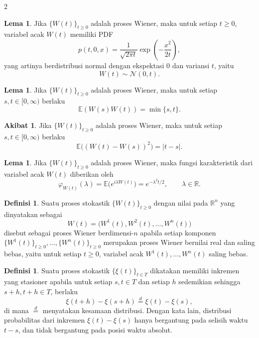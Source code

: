 \documentclass[a4paper,extrafontsizes, 9pt]{memoir}
\theoremstyle{definition}
\newtheorem{definisi}[kalstok]{Definisi}
\newtheorem{lemma}[kalstok]{Lema}
\newtheorem{akibat}[kalstok]{Akibat}
\theoremstyle{plain}
\theoremstyle{remark}
\begin{document}
\begin{multicols}{2}
  \begin{lemma}
    Jika $\{W(t)\}_{t\ge 0}$ adalah proses Wiener, maka untuk setiap $t\ge 0$, variabel acak
    $W(t)$ memiliki PDF
    \[p(t,0,x)=\frac{1}{\sqrt{2\pi t}}\exp\!\left(-\frac{x^2}{2t}\right),\]
    yang artinya berdistribusi normal dengan ekspektasi $0$ dan variansi $t$, yaitu
    \[W(t)\sim\mathcal{N}(0,t).\]
  \end{lemma}

  \begin{lemma}
    Jika $\{W(t)\}_{t\ge 0}$ adalah proses Wiener, maka untuk setiap $s,t\in[0,\infty)$ berlaku
    \[\mathbb{E}(W(s)W(t))=\min\{s,t\}.\]
  \end{lemma}

  \begin{akibat}
    Jika $\{W(t)\}_{t\ge 0}$ adalah proses Wiener, maka untuk setiap $s,t\in[0,\infty)$ berlaku
    \[\mathbb{E}\bigl((W(t)-W(s))^2\bigr)=|t-s|.\]
  \end{akibat}

  \begin{lemma}
    Jika $\{W(t)\}_{t\ge 0}$ adalah proses Wiener, maka fungsi karakteristik dari variabel acak
    $W(t)$ diberikan oleh
    \[\varphi_{W(t)}(\lambda)=\mathbb{E}\bigl(e^{i\lambda W(t)}\bigr)
      =e^{-\lambda^2 t/2},\qquad \lambda\in\mathbb{R}.\]
  \end{lemma}

  \begin{definisi}
    Suatu proses stokastik $\{W(t)\}_{t\ge 0}$ dengan nilai pada $\mathbb{R}^n$ yang dinyatakan
    sebagai
    \[W(t)=\bigl(W^1(t),W^2(t),\ldots,W^n(t)\bigr)\]
    disebut sebagai proses Wiener berdimensi-$n$ apabila setiap komponen
    $\{W^1(t)\}_{t\ge 0},\ldots,\{W^n(t)\}_{t\ge 0}$ merupakan proses Wiener bernilai real dan
    saling bebas, yaitu untuk setiap $t\ge 0$, variabel acak
    $W^1(t),\ldots,W^n(t)$ saling bebas.
  \end{definisi}

  \begin{definisi}
    Suatu proses stokastik $\{\xi(t)\}_{t\in T}$ dikatakan memiliki inkremen yang stasioner
    apabila untuk setiap $s,t\in T$ dan setiap $h$ sedemikian sehingga $s+h,t+h\in T$, berlaku
    \[\xi(t+h)-\xi(s+h)\overset{d}{=}\xi(t)-\xi(s),\]
    di mana $\overset{d}{=}$ menyatakan kesamaan distribusi. Dengan kata lain, distribusi
    probabilitas dari inkremen $\xi(t)-\xi(s)$ hanya bergantung pada selisih waktu $t-s$, dan
    tidak bergantung pada posisi waktu absolut.
  \end{definisi}


\end{multicols}
\end{document}
